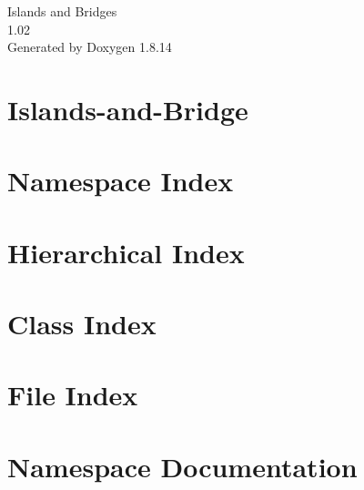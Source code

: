 \documentclass[twoside]{book}
\newcommand{\+}{\discretionary{\mbox{\scriptsize$\hookleftarrow$}}{}{}}
\newcommand{\clearemptydoublepage}{%
  \newpage{\pagestyle{empty}\cleardoublepage}%
}
\begin{document}
\hypersetup{pageanchor=false,
             bookmarksnumbered=true,
             pdfencoding=unicode
            }
\begin{titlepage}
\vspace*{7cm}
\begin{center}%
{\Large Islands and Bridges \\[1ex]\large 1.\+02 }\\
\vspace*{1cm}
{\large Generated by Doxygen 1.8.14}\\
\end{center}
\end{titlepage}
\clearemptydoublepage
{}
\tableofcontents
\clearemptydoublepage
{}
\hypersetup{pageanchor=true}

\chapter{Islands-\/and-\/\+Bridge}
\label{md__r_e_a_d_m_e}

\chapter{Namespace Index}

\chapter{Hierarchical Index}

\chapter{Class Index}

\chapter{File Index}

\chapter{Namespace Documentation}






\end{document}
